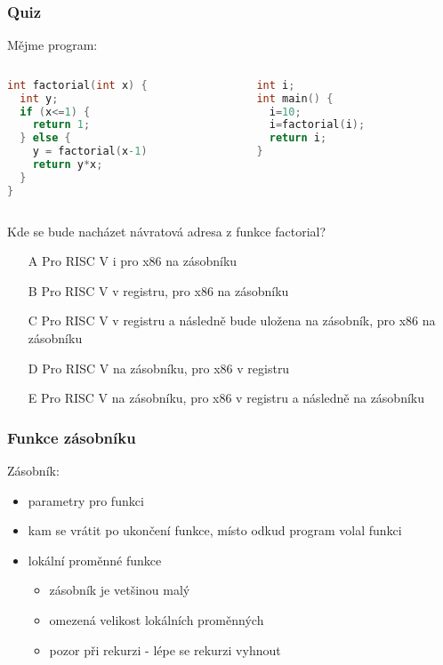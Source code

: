 \documentclass{beamer}
\begin{document}
\begin{frame}[fragile,shrink=10]
\frametitle{Quiz}

Mějme program:
\begin{columns}
\begin{column}{0.45\textwidth}
\begin{lstlisting}[language={C},columns=flexible]
int factorial(int x) {
  int y;
  if (x<=1) {
    return 1;
  } else {
    y = factorial(x-1)
    return y*x;
  }
}
\end{lstlisting}
\end{column}
\hfill
\begin{column}{0.45\textwidth}  
\begin{lstlisting}[language={C},columns=flexible]
int i;
int main() {
  i=10;
  i=factorial(i);
  return i;
}
\end{lstlisting}
\end{column}
\end{columns}

Kde se bude nacházet návratová adresa z funkce factorial?
\begin{itemize}
\item[A] Pro RISC V i pro x86 na zásobníku
\item[B] Pro RISC V v registru, pro x86 na zásobníku
\item[C] Pro RISC V v registru a následně bude uložena na zásobník, pro x86 na zásobníku
\item[D] Pro RISC V na zásobníku, pro x86 v registru
\item[E] Pro RISC V na zásobníku, pro x86 v registru a následně na zásobníku
\end{itemize}
\end{frame}


\begin{frame}
\frametitle{Funkce zásobníku}

Zásobník:
\begin{itemize}
  \item parametry pro funkci
  \item kam se vrátit po ukončení funkce, místo odkud program volal funkci
  \item lokální proměnné funkce
  \begin{itemize}
    \item zásobník je vetšinou malý
    \item omezená velikost lokálních proměnných
    \item pozor při rekurzi - lépe se rekurzi vyhnout
  \end{itemize}
\end{itemize}

\end{frame}
\end{document}

